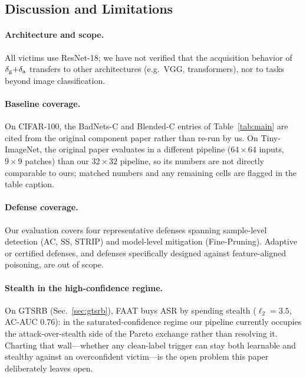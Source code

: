 \subsection{Discussion and Limitations}
\label{sec:limitations}

\paragraph{Architecture and scope.}
All victims use ResNet-18; we have not verified that the acquisition behavior
of $\delta_{\mathrm{g}}{+}\delta_{\mathrm{a}}$ transfers to other architectures (e.g.\ VGG,
transformers), nor to tasks beyond image classification.

\paragraph{Baseline coverage.}
On CIFAR-100, the BadNets-C and Blended-C entries of Table~\ref{tab:main} are
cited from the original component paper rather than re-run by us. On
Tiny-ImageNet, the original paper evaluates in a different pipeline
($64{\times}64$ inputs, $9{\times}9$ patches) than our $32{\times}32$ pipeline,
so its numbers are not directly comparable to ours; matched numbers and any
remaining cells are flagged in the table caption.

\paragraph{Defense coverage.}
Our evaluation covers four representative defenses spanning sample-level
detection (AC, SS, STRIP) and model-level mitigation (Fine-Pruning). Adaptive
or certified defenses, and defenses specifically designed against
feature-aligned poisoning, are out of scope.

\paragraph{Stealth in the high-confidence regime.}
On GTSRB (Sec.~\ref{sec:gtsrb}), FAAT buys ASR by spending stealth
($\ell_2\!=\!3.5$, AC-AUC $0.76$): in the saturated-confidence regime our
pipeline currently occupies the attack-over-stealth side of the Pareto
exchange rather than resolving it. Charting that wall---whether any
clean-label trigger can stay both learnable and stealthy against an
overconfident victim---is the open problem this paper deliberately leaves
open.
